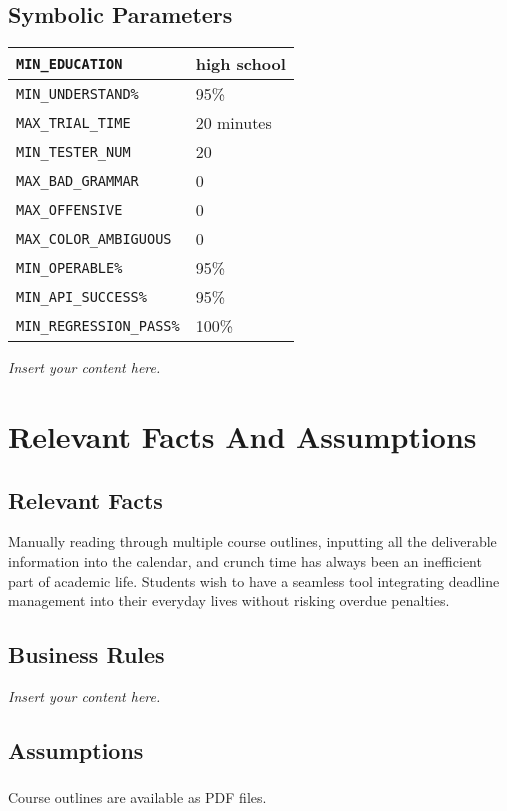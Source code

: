 \documentclass[12pt]{article}
\newcommand{\lips}{\textit{Insert your content here.}}
\begin{document}
\subsection{Symbolic Parameters}

\begin{tabular}{ |p{5cm}|p{5cm}|  }

\hline
\texttt{MIN\_EDUCATION} & high school\\
\hline
\texttt{MIN\_UNDERSTAND\%} & 95\%\\
\hline
\texttt{MAX\_TRIAL\_TIME} & 20 minutes\\
\hline
\texttt{MIN\_TESTER\_NUM} &  20\\
\hline
\texttt{MAX\_BAD\_GRAMMAR} & 0\\
\hline
\texttt{MAX\_OFFENSIVE} & 0\\
\hline
\texttt{MAX\_COLOR\_AMBIGUOUS} & 0\\
\hline
\texttt{MIN\_OPERABLE\%} & 95\%  \\
\hline
\texttt{MIN\_API\_SUCCESS\%} & 95\%  \\
\hline
\texttt{MIN\_REGRESSION\_PASS\%} & 100\%  \\
\hline
\end{tabular}
\lips

\section{Relevant Facts And Assumptions}
\subsection{Relevant Facts}
Manually reading through multiple course outlines, inputting all the deliverable information into the calendar, and crunch time has always been an inefficient part of academic life. Students wish to have a seamless tool integrating deadline management into their everyday lives without risking overdue penalties.
\subsection{Business Rules}
\lips
\subsection{Assumptions}
\subsubsection{}
Course outlines are available as PDF files.
\end{document}
